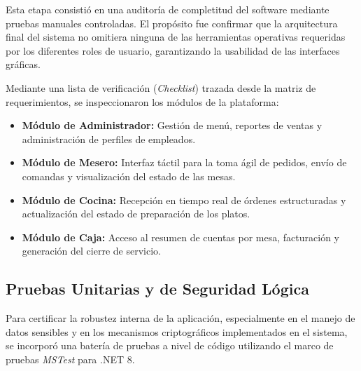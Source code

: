 Esta etapa consistió en una auditoría de completitud del software mediante pruebas manuales controladas. El propósito fue confirmar que la arquitectura final del sistema no omitiera ninguna de las herramientas operativas requeridas por los diferentes roles de usuario, garantizando la usabilidad de las interfaces gráficas.

Mediante una lista de verificación (\textit{Checklist}) trazada desde la matriz de requerimientos, se inspeccionaron los módulos de la plataforma:
\begin{itemize}
	\item \textbf{Módulo de Administrador:} Gestión de menú, reportes de ventas y administración de perfiles de empleados.
	\item \textbf{Módulo de Mesero:} Interfaz táctil para la toma ágil de pedidos, envío de comandas y visualización del estado de las mesas.
	\item \textbf{Módulo de Cocina:} Recepción en tiempo real de órdenes estructuradas y actualización del estado de preparación de los platos.
	\item \textbf{Módulo de Caja:} Acceso al resumen de cuentas por mesa, facturación y generación del cierre de servicio.
\end{itemize}

\subsection{Pruebas Unitarias y de Seguridad Lógica}

Para certificar la robustez interna de la aplicación, especialmente en el manejo de datos sensibles y en los mecanismos criptográficos implementados en el sistema, se incorporó una batería de pruebas a nivel de código utilizando el marco de pruebas \textit{MSTest} para .NET 8.

